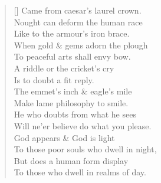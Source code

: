 \documentclass[MAIN]{subfiles}
\begin{document}
\begin{verse}[\versewidth]
Came from caesar's laurel crown.\\
Nought can deform the human race\\
Like to the armour's iron brace.\\
When gold \& gems adorn the plough\\
To peaceful arts shall envy bow.\\
A riddle or the cricket's cry\\
Is to doubt a fit reply.\\
The emmet's inch \& eagle's mile\\
Make lame philosophy to smile.\\
He who doubts from what he sees\\
Will ne'er believe do what you please.\\
God appears \& God is light\\
To those poor souls who dwell in night,\\
But does a human form display\\
To those who dwell in realms of day.
\end{verse}
\end{document}
